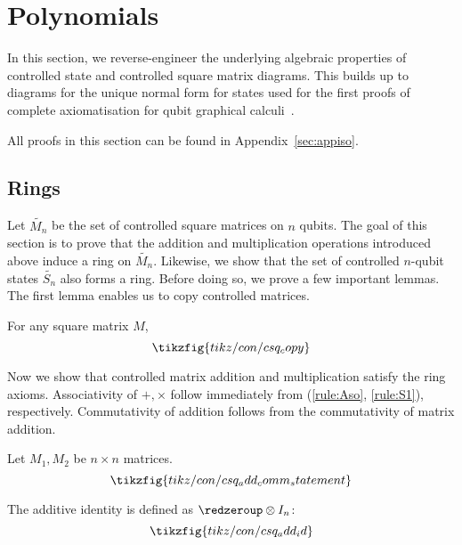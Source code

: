 \section{Polynomials}
In this section, we reverse-engineer the underlying algebraic properties of controlled state and controlled square matrix diagrams. This builds up to diagrams for the unique normal form for states used for the first proofs of complete axiomatisation for qubit graphical calculi~\cite{hadzihasanovic2017thesis, Hadzihasanovic2018zwzxcomplete}.

All proofs in this section can be found in Appendix~\ref*{sec:appiso}.

\subsection{Rings}\label{sec:ring}
Let $\tilde{M_n}$ be the set of controlled square matrices on $n$ qubits. The goal of this section is to prove that the addition and multiplication operations introduced above induce a ring on $\tilde{M_n}$. Likewise, we show that the set of controlled $n$-qubit states $\tilde{S_n}$ also forms a ring. Before doing so, we prove a few important lemmas. The first lemma enables us to copy controlled matrices.

\begin{lemma}\label{lem:csq_copy}
    For any square matrix $M$, 
    \begin{equation}\label{eq:csq_copy}
    \tikzfig{tikz/con/csq_copy}
\end{equation}
\end{lemma}

Now we show that controlled matrix addition and multiplication satisfy the ring axioms. Associativity of $+, \times$ follow immediately from (\ref{rule:Aso}, \ref{rule:S1}), respectively. Commutativity of addition follows from the commutativity of matrix addition.

\begin{lemma}\label{lem:csq_add_comm}
    Let $M_1, M_2$ be $n \times n$ matrices. 
    \begin{equation}\label{eq:csq_add_comm}
        \tikzfig{tikz/con/csq_add_comm_statement}
    \end{equation}
\end{lemma}


The additive identity is defined as $\redzeroup \otimes I_n$:
\begin{equation*}
    \tikzfig{tikz/con/csq_add_id}
\end{equation*}


